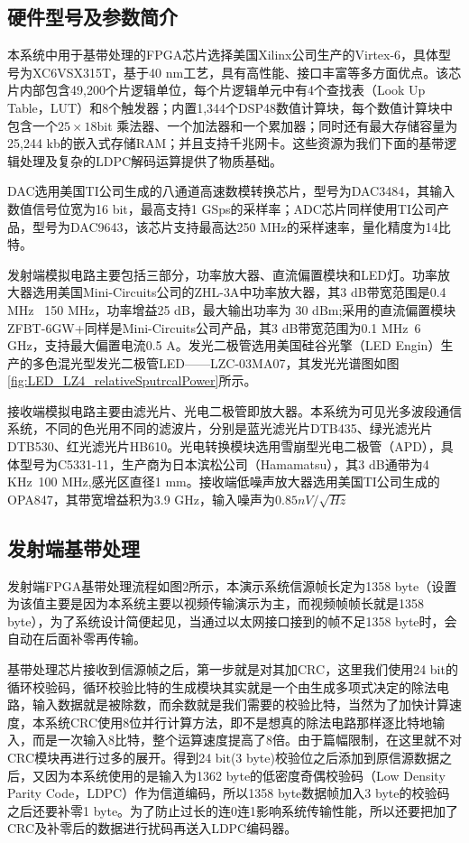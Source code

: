 \subsection{硬件型号及参数简介}
本系统中用于基带处理的FPGA芯片选择美国Xilinx公司生产的Virtex-6，具体型号为XC6VSX315T，基于40 nm工艺，具有高性能、接口丰富等多方面优点。该芯片内部包含49,200个片逻辑单位，每个片逻辑单元中有4个查找表（Look Up Table，LUT）和8个触发器；内置1,344个DSP48数值计算块，每个数值计算块中包含一个$25\times 18$bit 乘法器、一个加法器和一个累加器；同时还有最大存储容量为25,244 kb的嵌入式存储RAM；并且支持千兆网卡\cite{FPGAIntroduciton}。这些资源为我们下面的基带逻辑处理及复杂的LDPC解码运算提供了物质基础。

DAC选用美国TI公司生成的八通道高速数模转换芯片，型号为DAC3484，其输入数值信号位宽为16 bit，最高支持1 GSps的采样率；ADC芯片同样使用TI公司产品，型号为DAC9643，该芯片支持最高达250 MHz的采样速率，量化精度为14比特。

发射端模拟电路主要包括三部分，功率放大器、直流偏置模块和LED灯。功率放大器选用美国Mini-Circuits公司的ZHL-3A中功率放大器，其3 dB带宽范围是0.4 MHz ~150 MHz，功率增益25 dB，最大输出功率为 30 dBm;采用的直流偏置模块ZFBT-6GW+同样是Mini-Circuits公司产品，其3 dB带宽范围为0.1 MHz~6 GHz，支持最大偏置电流0.5 A。发光二极管选用美国硅谷光擎（LED Engin）生产的多色混光型发光二极管LED——LZC-03MA07，其发光光谱图如图\ref{fig:LED_LZ4_relativeSputrcalPower}所示。

接收端模拟电路主要由滤光片、光电二极管即放大器。本系统为可见光多波段通信系统，不同的色光用不同的滤波片，分别是蓝光滤光片DTB435、绿光滤光片DTB530、红光滤光片HB610。光电转换模块选用雪崩型光电二极管（APD），具体型号为C5331-11，生产商为日本滨松公司（Hamamatsu），其3 dB通带为4 KHz~100 MHz,感光区直径1 mm。接收端低噪声放大器选用美国TI公司生成的OPA847，其带宽增益积为3.9 GHz，输入噪声为$0.85 nV/\sqrt{Hz}$
\subsection{发射端基带处理}
发射端FPGA基带处理流程如图2所示，本演示系统信源帧长定为1358 byte（设置为该值主要是因为本系统主要以视频传输演示为主，而视频帧帧长就是1358 byte），为了系统设计简便起见，当通过以太网接口接到的帧不足1358 byte时，会自动在后面补零再传输。

基带处理芯片接收到信源帧之后，第一步就是对其加CRC，这里我们使用24 bit的循环校验码，循环校验比特的生成模块其实就是一个由生成多项式决定的除法电路，输入数据就是被除数，而余数就是我们需要的校验比特，当然为了加快计算速度，本系统CRC使用8位并行计算方法，即不是想真的除法电路那样逐比特地输入，而是一次输入8比特，整个运算速度提高了8倍。由于篇幅限制，在这里就不对CRC模块再进行过多的展开。得到24 bit(3 byte)校验位之后添加到原信源数据之后，又因为本系统使用的是输入为1362 byte的低密度奇偶校验码（Low Density Parity Code，LDPC）作为信道编码，所以1358 byte数据帧加入3 byte的校验码之后还要补零1 byte。为了防止过长的连0连1影响系统传输性能，所以还要把加了CRC及补零后的数据进行扰码再送入LDPC编码器。

